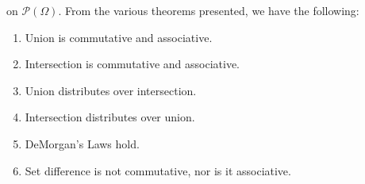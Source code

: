 \documentclass[crop=false,class=book,oneside]{standalone}
\begin{document}
            on $\mathcal{P}(\Omega)$. From the various theorems
            presented, we have the following:
            \begin{enumerate}
                \item Union is commutative and associative.
                \item Intersection is commutative and
                      associative.
                \item Union distributes over intersection.
                \item Intersection distributes over union.
                \item DeMorgan's Laws hold.
                \item Set difference is not commutative,
                      nor is it associative.
            \end{enumerate}
\end{document}
